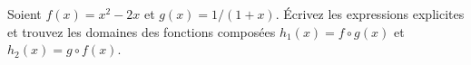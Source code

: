 
\begin{exercice}\label{exointerro-0008}

Soient $f(x)= x^2-2x$ et $g(x)=1/(1+x)$. Écrivez les expressions explicites et trouvez les domaines des fonctions composées $h_1 (x) = f\circ g (x)$ et $h_2(x)=g\circ f (x)$. 

\end{exercice}
